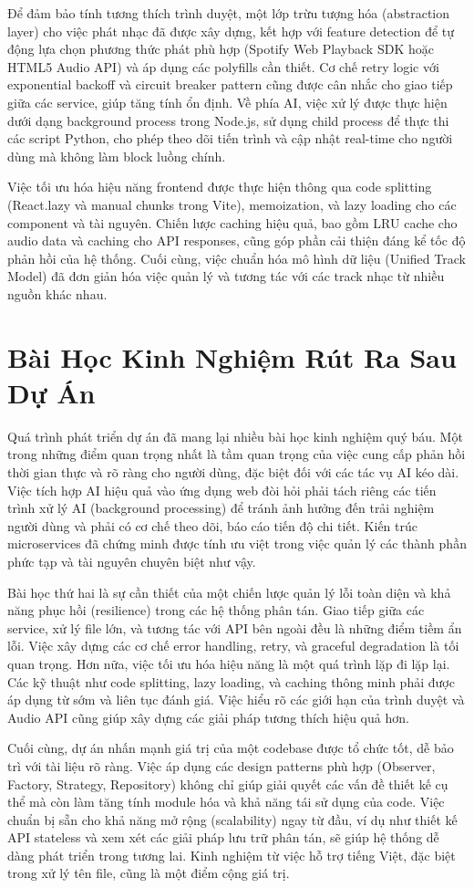 \documentclass[12pt,a4paper]{article}
\begin{document}
Để đảm bảo tính tương thích trình duyệt, một lớp trừu tượng hóa (abstraction layer) cho việc phát nhạc đã được xây dựng, kết hợp với feature detection để tự động lựa chọn phương thức phát phù hợp (Spotify Web Playback SDK hoặc HTML5 Audio API) và áp dụng các polyfills cần thiết. Cơ chế retry logic với exponential backoff và circuit breaker pattern cũng được cân nhắc cho giao tiếp giữa các service, giúp tăng tính ổn định. Về phía AI, việc xử lý được thực hiện dưới dạng background process trong Node.js, sử dụng child process để thực thi các script Python, cho phép theo dõi tiến trình và cập nhật real-time cho người dùng mà không làm block luồng chính.

Việc tối ưu hóa hiệu năng frontend được thực hiện thông qua code splitting (React.lazy và manual chunks trong Vite), memoization, và lazy loading cho các component và tài nguyên. Chiến lược caching hiệu quả, bao gồm LRU cache cho audio data và caching cho API responses, cũng góp phần cải thiện đáng kể tốc độ phản hồi của hệ thống. Cuối cùng, việc chuẩn hóa mô hình dữ liệu (Unified Track Model) đã đơn giản hóa việc quản lý và tương tác với các track nhạc từ nhiều nguồn khác nhau.

\section{Bài Học Kinh Nghiệm Rút Ra Sau Dự Án}

Quá trình phát triển dự án đã mang lại nhiều bài học kinh nghiệm quý báu. Một trong những điểm quan trọng nhất là tầm quan trọng của việc cung cấp phản hồi thời gian thực và rõ ràng cho người dùng, đặc biệt đối với các tác vụ AI kéo dài. Việc tích hợp AI hiệu quả vào ứng dụng web đòi hỏi phải tách riêng các tiến trình xử lý AI (background processing) để tránh ảnh hưởng đến trải nghiệm người dùng và phải có cơ chế theo dõi, báo cáo tiến độ chi tiết. Kiến trúc microservices đã chứng minh được tính ưu việt trong việc quản lý các thành phần phức tạp và tài nguyên chuyên biệt như vậy.

Bài học thứ hai là sự cần thiết của một chiến lược quản lý lỗi toàn diện và khả năng phục hồi (resilience) trong các hệ thống phân tán. Giao tiếp giữa các service, xử lý file lớn, và tương tác với API bên ngoài đều là những điểm tiềm ẩn lỗi. Việc xây dựng các cơ chế error handling, retry, và graceful degradation là tối quan trọng. Hơn nữa, việc tối ưu hóa hiệu năng là một quá trình lặp đi lặp lại. Các kỹ thuật như code splitting, lazy loading, và caching thông minh phải được áp dụng từ sớm và liên tục đánh giá. Việc hiểu rõ các giới hạn của trình duyệt và Audio API cũng giúp xây dựng các giải pháp tương thích hiệu quả hơn.

Cuối cùng, dự án nhấn mạnh giá trị của một codebase được tổ chức tốt, dễ bảo trì với tài liệu rõ ràng. Việc áp dụng các design patterns phù hợp (Observer, Factory, Strategy, Repository) không chỉ giúp giải quyết các vấn đề thiết kế cụ thể mà còn làm tăng tính module hóa và khả năng tái sử dụng của code. Việc chuẩn bị sẵn cho khả năng mở rộng (scalability) ngay từ đầu, ví dụ như thiết kế API stateless và xem xét các giải pháp lưu trữ phân tán, sẽ giúp hệ thống dễ dàng phát triển trong tương lai. Kinh nghiệm từ việc hỗ trợ tiếng Việt, đặc biệt trong xử lý tên file, cũng là một điểm cộng giá trị.
\end{document}
